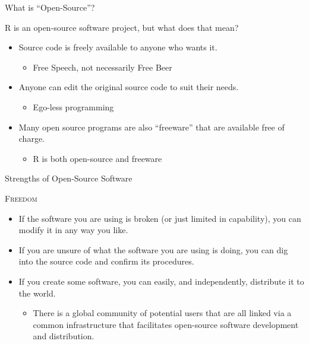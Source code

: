 \documentclass[10pt]{beamer}
\newcommand{\rmsc}[1]{\textrm{\textsc{#1}}}
\begin{document}
\begin{frame}{What is ``Open-Source''?}

  R is an open-source software project, but what does that mean?
  \va
  \begin{itemize}
  \item Source code is freely available to anyone who wants it.
    \vb
    \begin{itemize}
    \item Free Speech, not necessarily Free Beer
    \end{itemize}
    \vb
  \item Anyone can edit the original source code to suit their needs.
    \vb
    \begin{itemize}
    \item Ego-less programming
    \end{itemize}
    \vb
  \item Many open source programs are also ``freeware'' that are available free
    of charge.
    \vb
    \begin{itemize}
    \item R is both open-source and freeware
    \end{itemize}
  \end{itemize}

\end{frame}


\begin{frame}{Strengths of Open-Source Software}

  \rmsc{Freedom}
  \vb
  \begin{itemize}
  \item If the software you are using is broken (or just limited in capability), 
    you can modify it in any way you like.
    \vb
  \item If you are unsure of what the software you are using is doing, you can 
    dig into the source code and confirm its procedures.
    \vb
  \item If you create some software, you can easily, and independently, 
    distribute it to the world.
    \vb
    \begin{itemize}
    \item There is a global community of potential users that are all linked via 
      a common infrastructure that facilitates open-source software development 
      and distribution.
    \end{itemize}
  \end{itemize}

\end{frame}
\end{document}

